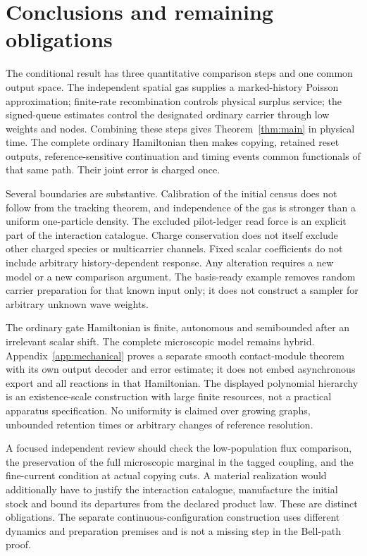 \documentclass[11pt]{article}
\theoremstyle{definition}\newtheorem{definition}[theorem]{Definition}
\theoremstyle{remark}\newtheorem{remark}[theorem]{Remark}
\begin{document}
\section{Conclusions and remaining obligations}
The conditional result has three quantitative comparison steps and one common output space. The independent spatial gas supplies a marked-history Poisson approximation; finite-rate recombination controls physical surplus service; the signed-queue estimates control the designated ordinary carrier through low weights and nodes. Combining these steps gives Theorem~\ref{thm:main} in physical time. The complete ordinary Hamiltonian then makes copying, retained reset outputs, reference-sensitive continuation and timing events common functionals of that same path. Their joint error is charged once.

Several boundaries are substantive. Calibration of the initial census does not follow from the tracking theorem, and independence of the gas is stronger than a uniform one-particle density. The excluded pilot-ledger read force is an explicit part of the interaction catalogue. Charge conservation does not itself exclude other charged species or multicarrier channels. Fixed scalar coefficients do not include arbitrary history-dependent response. Any alteration requires a new model or a new comparison argument. The basis-ready example removes random carrier preparation for that known input only; it does not construct a sampler for arbitrary unknown wave weights.

The ordinary gate Hamiltonian is finite, autonomous and semibounded after an irrelevant scalar shift. The complete microscopic model remains hybrid. Appendix~\ref{app:mechanical} proves a separate smooth contact-module theorem with its own output decoder and error estimate; it does not embed asynchronous export and all reactions in that Hamiltonian. The displayed polynomial hierarchy is an existence-scale construction with large finite resources, not a practical apparatus specification. No uniformity is claimed over growing graphs, unbounded retention times or arbitrary changes of reference resolution.

A focused independent review should check the low-population flux comparison, the preservation of the full microscopic marginal in the tagged coupling, and the fine-current condition at actual copying cuts. A material realization would additionally have to justify the interaction catalogue, manufacture the initial stock and bound its departures from the declared product law. These are distinct obligations. The separate continuous-configuration construction \cite{MassiveCompletion} uses different dynamics and preparation premises and is not a missing step in the Bell-path proof.
\end{document}
